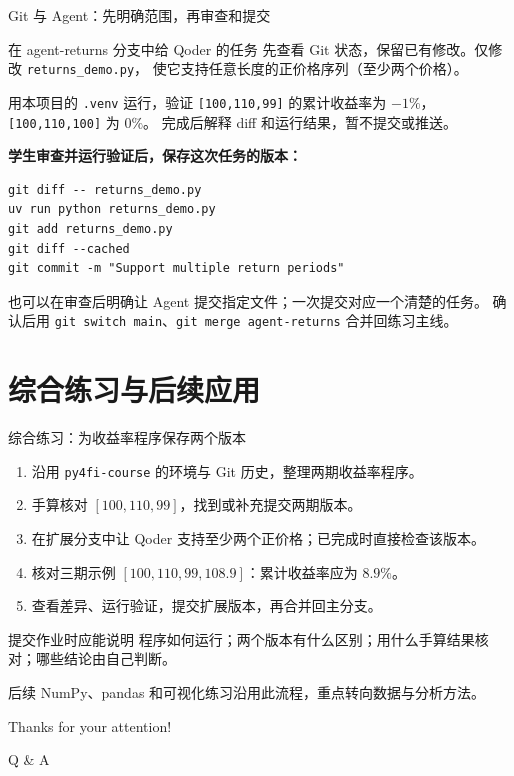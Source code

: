 \documentclass[9pt]{ctexbeamer}
\begin{document}
\begin{frame}[fragile]{Git 与 Agent：先明确范围，再审查和提交}
  \begin{block}{在 agent-returns 分支中给 Qoder 的任务}
    先查看 Git 状态，保留已有修改。仅修改 \texttt{returns\_demo.py}，
    使它支持任意长度的正价格序列（至少两个价格）。\par\medskip
    用本项目的 \texttt{.venv} 运行，验证 \texttt{[100,110,99]} 的累计收益率为
    $-1\%$，\texttt{[100,110,100]} 为 $0\%$。
    完成后解释 diff 和运行结果，暂不提交或推送。
  \end{block}
  \textbf{学生审查并运行验证后，保存这次任务的版本：}
\begin{lstlisting}[language={},numbers=none]
git diff -- returns_demo.py
uv run python returns_demo.py
git add returns_demo.py
git diff --cached
git commit -m "Support multiple return periods"
\end{lstlisting}
  {\small 也可以在审查后明确让 Agent 提交指定文件；一次提交对应一个清楚的任务。
  确认后用 \texttt{git switch main}、\texttt{git merge agent-returns} 合并回练习主线。}
\end{frame}

\section{综合练习与后续应用}

\begin{frame}{综合练习：为收益率程序保存两个版本}
  \begin{enumerate}
    \item 沿用 \texttt{py4fi-course} 的环境与 Git 历史，整理两期收益率程序。
    \item 手算核对 $[100,110,99]$，找到或补充提交两期版本。
    \item 在扩展分支中让 Qoder 支持至少两个正价格；已完成时直接检查该版本。
    \item 核对三期示例 $[100,110,99,108.9]$：累计收益率应为 $8.9\%$。
    \item 查看差异、运行验证，提交扩展版本，再合并回主分支。
  \end{enumerate}
  \begin{block}{提交作业时应能说明}
    程序如何运行；两个版本有什么区别；用什么手算结果核对；哪些结论由自己判断。
  \end{block}
  {\small 后续 NumPy、pandas 和可视化练习沿用此流程，重点转向数据与分析方法。}
\end{frame}

\appendix



\begin{frame}
	\begin{center}
		{\Huge\calligra Thanks for your attention!}
		\vspace{1cm}

		{\Huge Q \& A}
	\end{center}
\end{frame}
\end{document}
